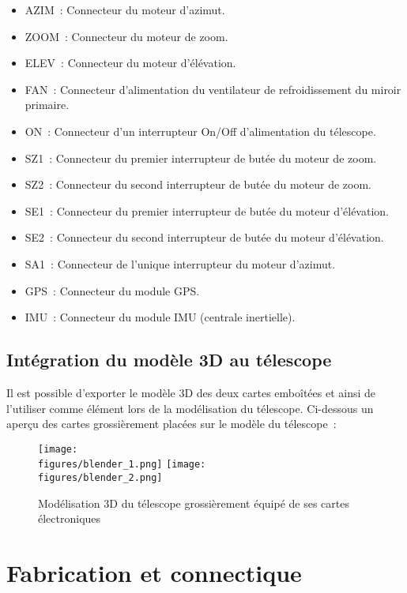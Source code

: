 \begin{itemize}[label=$\bullet$]
	\item AZIM~: Connecteur du moteur d'azimut.
	\item ZOOM~: Connecteur du moteur de zoom.
	\item ELEV~: Connecteur du moteur d'élévation.
	\item FAN~: Connecteur d'alimentation du ventilateur de refroidissement du miroir primaire.
	\item ON~: Connecteur d'un interrupteur On/Off d'alimentation du télescope.
	\item SZ1~: Connecteur du premier interrupteur de butée du moteur de zoom.
	\item SZ2~: Connecteur du second interrupteur de butée du moteur de zoom.
	\item SE1~: Connecteur du premier interrupteur de butée du moteur d'élévation.
	\item SE2~: Connecteur du second interrupteur de butée du moteur d'élévation.
	\item SA1~: Connecteur de l'unique interrupteur du moteur d'azimut.
	\item GPS~: Connecteur du module GPS.
	\item IMU~: Connecteur du module IMU (centrale inertielle).
	\end{itemize}

\subsection{Intégration du modèle 3D au télescope}

Il est possible d'exporter le modèle 3D des deux cartes emboîtées et ainsi de l'utiliser comme élément lors de la modélisation du télescope. Ci-dessous un aperçu des cartes grossièrement placées sur le modèle du télescope~:

\begin{figure}[H]
    \centering
    \texttt{[image: \\figures/blender\_1.png]}
    \texttt{[image: \\figures/blender\_2.png]}
    \decoRule
    \caption[
    Modélisation 3D du télescope grossièrement équipé de ses cartes électroniques]{
    Modélisation 3D du télescope grossièrement équipé de ses cartes électroniques}
    \label{fig:Modélisation 3D du télescope grossièrement équipé de ses cartes électroniques}
    \end{figure}

\section{Fabrication et connectique}


